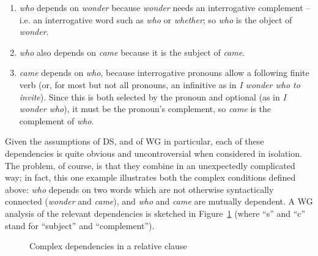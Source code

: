 \documentclass[output=paper]{langscibook}
\begin{document}
\begin{enumerate}
	\item \label{it:6} \emph{who} depends on \emph{wonder} because \emph{wonder} needs an interrogative complement – i.e. an interrogative word such as \emph{who} or \emph{whether}; so \emph{who} is the object of \emph{wonder}.
	
	\item \label{it:7} \emph{who} also depends on \emph{came} because it is the subject of \emph{came}.
	
	\item \label{it:8} \emph{came} depends on \emph{who}, because interrogative pronouns allow a following finite verb (or, for most but not all pronouns, an infinitive as in \emph{I wonder who to invite}). Since this is both selected by the pronoun and optional (as in \emph{I wonder who}), it must be the pronoun’s complement, so \emph{came} is the complement of \emph{who}.
\end{enumerate}

Given the assumptions of DS, and of WG in particular, each of these dependencies is quite obvious and uncontroversial when considered in isolation. The problem, of course, is that they combine in an unexpectedly complicated way; in fact, this one example illustrates both the complex conditions defined above: \emph{who} depends on two words which are not otherwise syntactically connected (\emph{wonder} and \emph{came}), and \emph{who} and \emph{came} are mutually dependent. A WG analysis of the relevant dependencies is sketched in Figure~\ref{fig:16} (where ``s'' and ``c'' stand for ``subject'' and ``complement'').

\begin{figure}
	\centering
{}
	\caption{Complex dependencies in a relative clause}
	\label{fig:16}
\end{figure}
\end{document}
